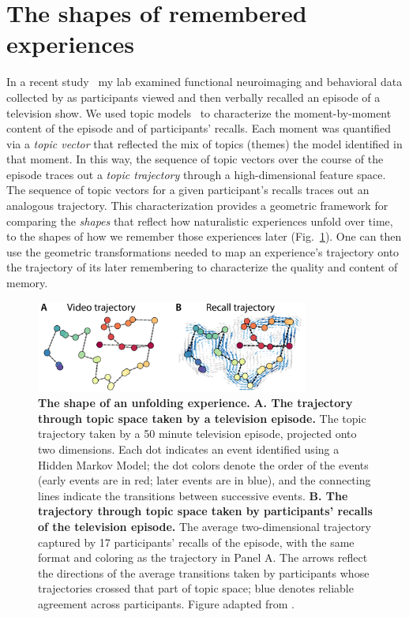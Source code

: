 \documentclass{article}
\begin{document}
\section*{The shapes of remembered experiences}
In a recent study~\citep{HeusEtal18c} my lab examined functional neuroimaging and behavioral data collected by \cite{ChenEtal17} as participants viewed and then verbally recalled an episode of a television show.  We used topic models~\citep{BleiEtal03} to characterize the moment-by-moment content of the episode and of participants' recalls.  Each moment was quantified via a \textit{topic vector} that reflected the mix of topics (themes) the model identified in that moment.  In this way, the sequence of topic vectors over the course of the episode traces out a \textit{topic trajectory} through a high-dimensional feature space.  The sequence of topic vectors for a given participant's recalls traces out an analogous trajectory.  This characterization provides a geometric framework for comparing the \textit{shapes} that reflect how naturalistic experiences unfold over time, to the shapes of how we remember those experiences later (Fig.~\ref{fig:trajectories}).  One can then use the geometric transformations needed to map an experience's trajectory onto the trajectory of its later remembering to characterize the quality and content of memory.

\begin{figure}[tp]
\centering
\includegraphics[width=0.8\textwidth]{figs/trajectory}
\caption{\textbf{The shape of an unfolding experience.}  \textbf{A. The trajectory through topic space taken by a television episode.} The topic trajectory taken by a 50 minute television episode, projected onto two dimensions.  Each dot indicates an event identified using a Hidden Markov Model; the dot colors denote the order of the events (early events are in red; later events are in blue), and the connecting lines indicate the transitions between successive events.  \textbf{B. The trajectory through topic space taken by participants' recalls of the television episode.} The average two-dimensional trajectory captured by 17 participants' recalls of the episode, with the same format and coloring as the trajectory in Panel A. The arrows reflect the directions of the average transitions taken by participants whose trajectories crossed that part of topic space; blue denotes reliable agreement across participants.  Figure adapted from \cite{HeusEtal18c}.}
\label{fig:trajectories}
\end{figure}
\end{document}
